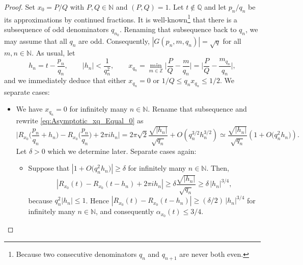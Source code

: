 \documentclass[10pt,a4paper]{amsart}
\begin{document}
\begin{proof}
Set $x_0 = P/Q$ with $P,Q \in \mathbb N$ and $(P,Q) = 1$. 
Let $t \not\in \mathbb Q$ and let $p_n/q_n$ be its approximations by continued fractions. 
It is well-known\footnote{Because two consecutive denominators $q_n$ and $q_{n+1}$ are never both even.} that there is a subsequence of odd denominators $q_{n_k}$. 
Renaming that subsequence back to $q_n$, we may assume that all $q_n$ are odd. 
Consequently, $|G(p_n, m, q_n)| = \sqrt{q}$ for all $m, n \in \mathbb N$. 
As usual, let 
\begin{equation}
h_n =  t - \frac{p_n}{q_n}, 
\qquad|h_n| < \frac{1}{q_n^2}, 
\qquad x_{q_n} = \min_{m \in \mathbb Z} \Big| \frac{P}{Q} - \frac{m}{q_n} \Big| = \Big| \frac{P}{Q} - \frac{m_{q_n}}{q_n} \Big|,
\end{equation}
and we immediately deduce that either $x_{q_n} = 0$ or $1/Q \leq q_n x_{q_n} \leq 1/2$. 
We separate cases:
\begin{itemize}
	\item[\textbf{Case 1}] We have $x_{q_n} = 0$ for infinitely many $n \in \mathbb N$. 
	Rename that subsequence and rewrite \eqref{eq:Asymptotic_xq_Equal_0} as 
	\begin{equation}\label{eq:Asymptotic_Case_1}
\Big| R_{x_0} \Big( \frac{p_n}{q_n} + h_n \Big)  - R_{x_0}\Big( \frac{p_n}{q_n} \Big) + 2\pi i h_n   \Big| 
 = 2\pi \sqrt{2} \frac{\sqrt{|h_n|}}{\sqrt{q_n}}  + O\left( q_n^{3/2} h_n^{3/2}  \right) 
 \simeq \frac{\sqrt{|h_n|}}{\sqrt{q_n}} \left(  1 + O\big( q_n^2 h_n \big) \right).
\end{equation}
Let $\delta > 0$ which we determine later. Separate cases again:
\begin{itemize}
	\item[\textbf{Case 1.1.}] Suppose that $\left|  1 + O\big( q_n^2 h_n \big) \right| \geq \delta$ for infinitely many $n \in \mathbb N$. 
	Then, 
	\begin{equation}
	\left| R_{x_0} (t) - R_{x_0}( t - h_n ) + 2\pi i h_n   \right| 
	\geq \delta \frac{\sqrt{|h_n|}}{\sqrt{q_n}}  
	\geq \delta \, |h_n|^{3/4}, 
	\end{equation}
	because $q_n^2 |h_n| \leq 1$. 
	Hence $| R_{x_0} (t) - R_{x_0}( t - h_n )| \geq (\delta/2) \, |h_n|^{3/4}$ for infinitely many $n \in \mathbb N$,
	and consequently $\alpha_{x_0}(t) \leq 3/4$. 
	

\end{itemize}
\end{itemize}
\end{proof}
\end{document}
